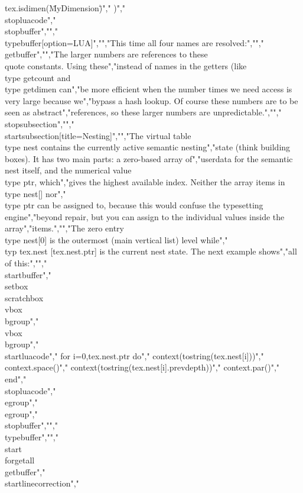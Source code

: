 tex.isdimen(\"MyDimension\")","    )","\\stopluacode","\\stopbuffer","","\\typebuffer[option=LUA]","","This time all four names are resolved:","","\\getbuffer","","The larger numbers are references to these \\quote {constants}. Using these","instead of names in the getters (like \\type {getcount} and \\type {getdimen} can","be more efficient when the number times we need access is very large because we","bypass a hash lookup. Of course these numbers are to be seen as abstract","references, so these larger numbers are unpredictable.","","\\stopsubsection","","\\startsubsection[title=Nesting]","","The virtual table \\type {nest} contains the currently active semantic nesting","state (think building boxes). It has two main parts: a zero-based array of","userdata for the semantic nest itself, and the numerical value \\type {ptr}, which","gives the highest available index. Neither the array items in \\type {nest[]} nor","\\type {ptr} can be assigned to, because this would confuse the typesetting engine","beyond repair, but you can assign to the individual values inside the array","items.","","The zero entry \\type {nest[0]} is the outermost (main vertical list) level while","\\typ {tex.nest [tex.nest.ptr]} is the current nest state. The next example shows","all of this:","","\\startbuffer","\\setbox\\scratchbox\\vbox\\bgroup","    \\vbox\\bgroup","        \\startluacode","            for i=0,tex.nest.ptr do","                context(tostring(tex.nest[i]))","                context.space()","                context(tostring(tex.nest[i].prevdepth))","                context.par()","            end","        \\stopluacode","    \\egroup","\\egroup","\\stopbuffer","","\\typebuffer","","\\start \\forgetall \\getbuffer","\\startlinecorrection","    
